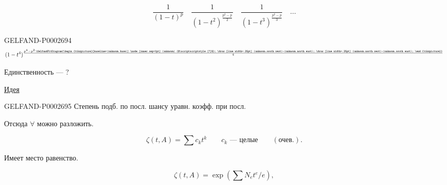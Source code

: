 \begin{equation*}
\frac{1}{(1-t)^p}\quad
\frac{1}{(1-t^2)^{\frac{p^2-p}{2}}}\quad
\frac{1}{(1-t^3)^{\frac{p^3-p}{3}}}\quad\ldots
\end{equation*}

\begin{GelfandAdjacentEvidence}{GELFAND-P000269}{4}
\begin{equation*}
(1-t^4)^{\frac{p^4-p^2\,\GelfandFitDiagram{\begin{tikzpicture}[baseline=(unknown.base)]
\node[inner sep=0pt] (unknown) {$\scriptscriptstyle[?]$};
\draw[line width=.25pt] (unknown.south west)--(unknown.north east);
\draw[line width=.25pt] (unknown.north west)--(unknown.south east);
\end{tikzpicture}}}{4}}
\end{equation*}

\end{GelfandAdjacentEvidence}


Единственность --- ?

\underline{Идея}

\begin{GelfandAdjacentEvidence}{GELFAND-P000269}{5}
Степень подб. по посл. шансу уравн. коэфф. при посл.

\end{GelfandAdjacentEvidence}


Отсюда $\forall$ можно разложить.



\hfill{}

\begin{equation*}
\zeta(t,A)=\sum c_kt^k\qquad c_k\text{ --- целые}\qquad (\text{очев.}).
\end{equation*}

Имеет место равенство.

\begin{equation*}
\zeta(t,A)=\exp\left(\sum N_e t^e/e\right),
\end{equation*}

